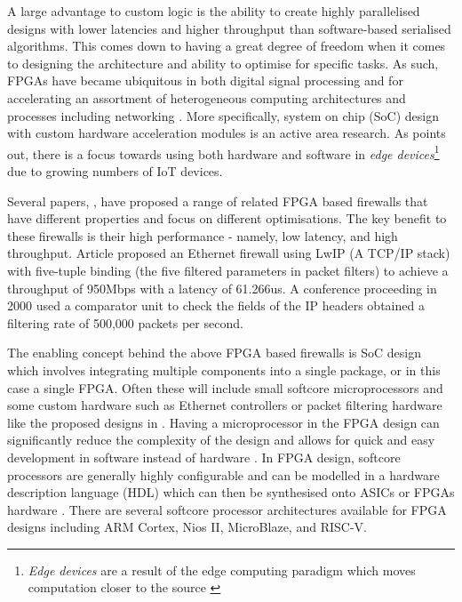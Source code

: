 A large advantage to custom logic is the ability to create highly parallelised designs with lower latencies and higher throughput than software-based serialised algorithms. This comes down to 
having a great degree of freedom when it comes to designing the architecture and ability to optimise for specific tasks.
As such, FPGAs have became ubiquitous in both digital signal processing and for accelerating an assortment of heterogeneous computing architectures and processes including networking \cite{FPGAComputing}.
More specifically, system on chip (SoC) design with custom hardware acceleration modules is an active area research. As \cite{FPGAComputing} points out, there is a focus towards using both hardware and software in \textit{edge devices}\footnote[1]{\textit{Edge devices} are a result of the edge computing paradigm which moves computation closer to the source \cite{EdgeComputing}} due to growing numbers of IoT devices.


Several papers, \cite{LwIPFPGAFirewall} \cite{IPFPGAFirewall2000} \cite{packetFilteringFPGA}, have proposed a range of related FPGA based firewalls that have different properties and focus on different optimisations. The key benefit to these firewalls is their high performance - namely, low latency, and high throughput. 
Article \cite{LwIPFPGAFirewall} proposed an Ethernet firewall using LwIP (A TCP/IP stack) with five-tuple binding (the five filtered parameters in packet filters) 
to achieve a throughput of 950Mbps with a latency of 61.266us. A conference proceeding in 2000 \cite{IPFPGAFirewall2000} used a comparator unit to check the fields of the IP headers obtained a filtering rate of 500,000 packets per second. 


The enabling concept behind the above FPGA based firewalls is SoC design which involves integrating multiple components into a single package, or in this case a 
single FPGA. Often these will include small softcore microprocessors and some custom hardware such as Ethernet controllers or packet filtering hardware like the proposed designs in \cite{LwIPFPGAFirewall}.
Having a microprocessor in the FPGA design can significantly reduce the complexity of the design and allows for quick and easy development in software instead of hardware \cite{SoftcoreBasedEmbeddedSystems}. In FPGA design, softcore processors are generally highly configurable and can be modelled in a hardware description language (HDL) which can then be synthesised onto ASICs or FPGAs hardware \cite{SoftcoreBasedEmbeddedSystems}. There are several softcore processor architectures available for FPGA designs including ARM Cortex, Nios II, MicroBlaze, and RISC-V. 
 
